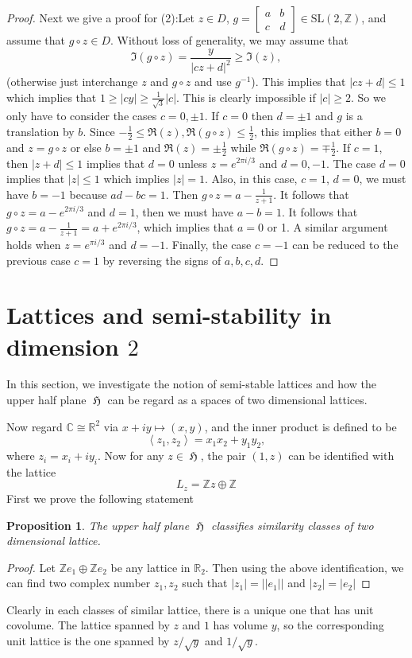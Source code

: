 \documentclass[12pt]{article} %
\newtheorem{prop}{Proposition}[section]
\DeclareMathOperator{\uH}{\mathfrak{H}}
\begin{document}
\begin{proof}
  Next we give a proof for (2):Let $z \in D$, $g = \begin{bmatrix} a & b \\ c & d \end{bmatrix} \in \mathrm{SL}(2, \mathbb{Z})$, and assume that $g \circ z \in D$. Without loss of generality, we may assume that
  \[
    \Im(g \circ z) = \frac{y}{|cz + d|^2} \geq \Im(z),
  \]
  (otherwise just interchange $z$ and $g \circ z$ and use $g^{-1}$). This implies that $|cz + d| \leq 1$ which implies that $1 \geq |cy| \geq \frac{1}{\sqrt{3}}|c|$. This is clearly impossible if $|c| \geq 2$. So we only have to consider the cases $c = 0, \pm 1$. If $c = 0$ then $d = \pm 1$ and $g$ is a translation by $b$. Since $-\frac{1}{2} \leq \Re(z), \Re(g \circ z) \leq \frac{1}{2}$, this implies that either $b = 0$ and $z = g \circ z$ or else $b = \pm 1$ and $\Re(z) = \pm \frac{1}{2}$ while $\Re(g \circ z) = \mp \frac{1}{2}$. If $c = 1$, then $|z + d| \leq 1$ implies that $d = 0$ unless $z = e^{2\pi i / 3}$ and $d = 0, -1$. The case $d = 0$ implies that $|z| \leq 1$ which implies $|z| = 1$. Also, in this case, $c = 1$, $d = 0$, we must have $b = -1$ because $ad - bc = 1$. Then $g \circ z = a - \frac{1}{z + 1}$. It follows that $g \circ z = a - e^{2\pi i / 3}$ and $d = 1$, then we must have $a - b = 1$. It follows that $g \circ z = a - \frac{1}{z + 1} = a + e^{2\pi i / 3}$, which implies that $a = 0$ or 1. A similar argument holds when $z = e^{\pi i / 3}$ and $d = -1$. Finally, the case $c = -1$ can be reduced to the previous case $c = 1$ by reversing the signs of $a, b, c, d$.
\end{proof}
\section{Lattices and semi-stability in dimension $2$}
In this section, we investigate the notion of semi-stable lattices and how the
upper half plane $\uH$ can be regard as a spaces of two dimensional lattices.

Now regard $\mathbb{C} \cong \mathbb{R}^2$ via $x+iy \mapsto (x,y)$, and the inner product is defined to be
\[\left\langle z_1, z_2 \right\rangle = x_1x_2 + y_1y_2,\]
where $z_i= x_i+iy_i$. Now for any $z \in \uH$, the pair $(1,z)$ can be identified with the lattice
\[L_z = \mathbb{Z}z \oplus \mathbb{Z}\]
First we prove the following statement
\begin{prop}
  The upper half plane $\uH$ classifies similarity classes of two dimensional lattice.
\end{prop}
\begin{proof}
  Let $\mathbb{Z}e_1\oplus \mathbb{Z}e_2$ be any lattice in $\mathbb{R}_2$. Then using the
  above identification, we can find two complex number $z_1,z_2$ such that $|z_1| = ||e_1||$ and
  $|z_2| = \lvert e_2 \rvert$
\end{proof}
Clearly in each classes of similar lattice, there is a unique one that has unit covolume.
The lattice spanned by $z$ and $1$ has volume $y$, so the corresponding unit lattice is the one spanned
by $z/\sqrt{y}$ and $1/\sqrt{y}$.
\end{document}
